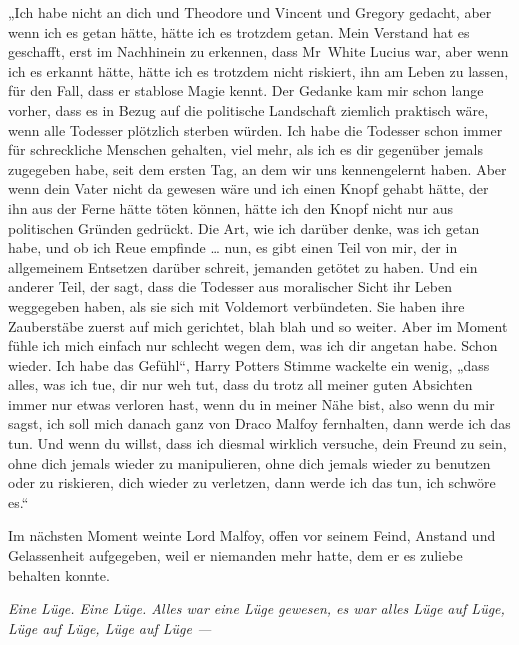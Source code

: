 „Ich habe nicht an dich und Theodore und Vincent und Gregory gedacht, aber wenn ich es getan hätte, hätte ich es trotzdem getan. Mein Verstand hat es geschafft, erst im Nachhinein zu erkennen, dass Mr~White Lucius war, aber wenn ich es erkannt hätte, hätte ich es trotzdem nicht riskiert, ihn am Leben zu lassen, für den Fall, dass er stablose Magie kennt. Der Gedanke kam mir schon lange vorher, dass es in Bezug auf die politische Landschaft ziemlich praktisch wäre, wenn alle Todesser plötzlich sterben würden. Ich habe die Todesser schon immer für schreckliche Menschen gehalten, viel mehr, als ich es dir gegenüber jemals zugegeben habe, seit dem ersten Tag, an dem wir uns kennengelernt haben. Aber wenn dein Vater nicht da gewesen wäre und ich einen Knopf gehabt hätte, der ihn aus der Ferne hätte töten können, hätte ich den Knopf nicht nur aus politischen Gründen gedrückt. Die Art, wie ich darüber denke, was ich getan habe, und ob ich Reue empfinde … nun, es gibt einen Teil von mir, der in allgemeinem Entsetzen darüber schreit, jemanden getötet zu haben. Und ein anderer Teil, der sagt, dass die Todesser aus moralischer Sicht ihr Leben weggegeben haben, als sie sich mit Voldemort verbündeten. Sie haben ihre Zauberstäbe zuerst auf mich gerichtet, blah blah und so weiter. Aber im Moment fühle ich mich einfach nur schlecht wegen dem, was ich dir angetan habe. Schon wieder. Ich habe das Gefühl“, Harry Potters Stimme wackelte ein wenig, „dass alles, was ich tue, dir nur weh tut, dass du trotz all meiner guten Absichten immer nur etwas verloren hast, wenn du in meiner Nähe bist, also wenn du mir sagst, ich soll mich danach ganz von Draco Malfoy fernhalten, dann werde ich das tun. Und wenn du willst, dass ich diesmal wirklich versuche, dein Freund zu sein, ohne dich jemals wieder zu manipulieren, ohne dich jemals wieder zu benutzen oder zu riskieren, dich wieder zu verletzen, dann werde ich das tun, ich schwöre es.“

Im nächsten Moment weinte Lord Malfoy, offen vor seinem Feind, Anstand und Gelassenheit aufgegeben, weil er niemanden mehr hatte, dem er es zuliebe behalten konnte.

\emph{Eine Lüge. Eine Lüge. Alles war eine Lüge gewesen, es war alles Lüge auf Lüge, Lüge auf Lüge, Lüge auf Lüge —}

